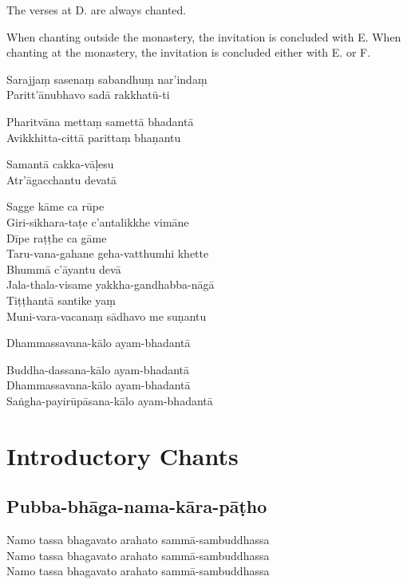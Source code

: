 The verses at D. are always chanted.

When chanting outside the monastery, the invitation is concluded with E. When
chanting at the monastery, the invitation is concluded either with E. or F.

\begin{paritta}


%
Sarajjaṃ sasenaṃ sabandhuṃ nar'indaṃ\\
Paritt'ānubhavo sadā rakkhatū-ti

%
Pharitvāna mettaṃ samettā bhadantā\\
Avikkhitta-cittā parittaṃ bhaṇantu

%
Samantā cakka-vāḷesu\\
Atr'āgacchantu devatā

%
Sagge kāme ca rūpe\\
Giri-sikhara-taṭe c'antalikkhe vimāne\\
Dīpe raṭṭhe ca gāme\\
Taru-vana-gahane geha-vatthumhi khette\\
Bhummā c'āyantu devā\\
Jala-thala-visame yakkha-gandhabba-nāgā\\
Tiṭṭhantā santike yaṃ\\
Muni-vara-vacanaṃ sādhavo me suṇantu

%
Dhammassavana-kālo ayam-bhadantā


%
Buddha-dassana-kālo ayam-bhadantā\\
Dhammassavana-kālo ayam-bhadantā\\
Saṅgha-payirūpāsana-kālo ayam-bhadantā
\end{paritta}


\clearpage

\section{Introductory Chants}

\subsection{Pubba-bhāga-nama-kāra-pāṭho}
\label{namo-tassa}

Namo tassa bhagavato arahato sammā-sambuddhassa\\
Namo tassa bhagavato arahato sammā-sambuddhassa\\
Namo tassa bhagavato arahato sammā-sambuddhassa

